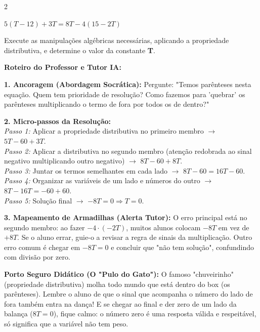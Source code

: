 \begin{multicols*}{2}
\begin{enunciadoLiteral}
$ 5(T - 12) + 3T = 8T - 4(15 - 2T) $

Execute as manipulações algébricas necessárias, aplicando a propriedade distributiva, e determine o valor da constante \textbf{T}.
\end{enunciadoLiteral}

\ifgabarito
    \begin{tcolorbox}[colback=CorTitUm!5, colframe=CorTitUm, boxrule=1pt, arc=4pt, left=6pt, right=6pt, top=6pt, bottom=6pt]
    \small\textbf{\textcolor{CorTitUm}{Roteiro do Professor e Tutor IA:}}\par\vspace{0.1cm}
    \color{CinzaEscuro}
    \textbf{1. Ancoragem (Abordagem Socrática):} Pergunte: "Temos parênteses nesta equação. Quem tem prioridade de resolução? Como fazemos para 'quebrar' os parênteses multiplicando o termo de fora por todos os de dentro?"\par\vspace{0.1cm}
    
    \textbf{2. Micro-passos da Resolução:}\\
    \textit{Passo 1:} Aplicar a propriedade distributiva no primeiro membro $\rightarrow$ $5T - 60 + 3T$.\\
    \textit{Passo 2:} Aplicar a distributiva no segundo membro (atenção redobrada ao sinal negativo multiplicando outro negativo) $\rightarrow$ $8T - 60 + 8T$.\\
    \textit{Passo 3:} Juntar os termos semelhantes em cada lado $\rightarrow$ $8T - 60 = 16T - 60$.\\
    \textit{Passo 4:} Organizar as variáveis de um lado e números do outro $\rightarrow$ $8T - 16T = -60 + 60$.\\
    \textit{Passo 5:} Solução final $\rightarrow$ $-8T = 0 \Rightarrow T = 0$.\par\vspace{0.1cm}
    
    \textbf{3. Mapeamento de Armadilhas (Alerta Tutor):} O erro principal está no segundo membro: ao fazer $-4 \cdot (-2T)$, muitos alunos colocam $-8T$ em vez de $+8T$. Se o aluno errar, guie-o a revisar a regra de sinais da multiplicação. Outro erro comum é chegar em $-8T = 0$ e concluir que "não tem solução", confundindo com divisão por zero.
    \end{tcolorbox}
    \vspace{0.15cm}
    
    \begin{boxexplicacao}
    \textbf{Porto Seguro Didático (O "Pulo do Gato"):} O famoso "chuveirinho" (propriedade distributiva) molha todo mundo que está dentro do box (os parênteses). Lembre o aluno de que o sinal que acompanha o número do lado de fora também entra na dança! E se chegar ao final e der zero de um lado da balança ($8T = 0$), fique calmo: o número zero é uma resposta válida e respeitável, só significa que a variável não tem peso.
    \end{boxexplicacao}
\fi


\end{multicols*}
